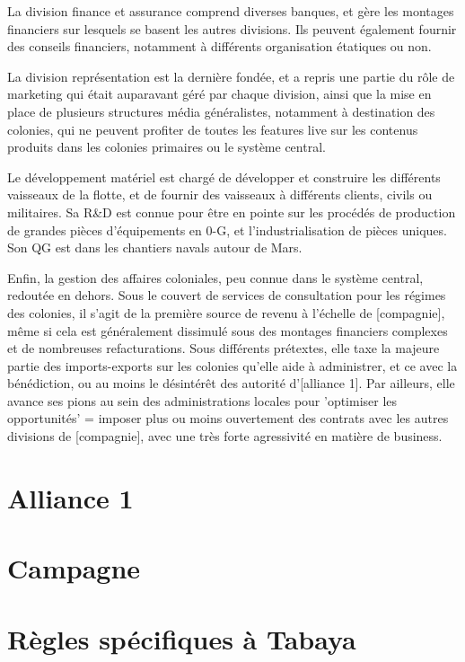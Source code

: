 \documentclass[10pt,a4paper]{book}
\begin{document}
\begin{multicols}{2}
La division finance et assurance comprend diverses banques, et gère les montages financiers sur lesquels se basent les autres divisions. Ils peuvent également fournir des conseils financiers, notamment à différents organisation étatiques ou non.

La division représentation est la dernière fondée, et a repris une partie du rôle de marketing qui était auparavant géré par chaque division, ainsi que la mise en place de plusieurs structures média généralistes, notamment à destination des colonies, qui ne peuvent profiter de toutes les features live sur les contenus produits dans les colonies primaires ou le système central.

Le développement matériel est chargé de développer et construire les différents vaisseaux de la flotte, et de fournir des vaisseaux à différents clients, civils ou militaires. Sa R\&D est connue pour être en pointe sur les procédés de production de grandes pièces d'équipements en 0-G, et l'industrialisation de pièces uniques. Son QG est dans les chantiers navals autour de Mars.

Enfin, la gestion des affaires coloniales, peu connue dans le système central, redoutée en dehors. Sous le couvert de services de consultation pour les régimes des colonies, il s'agit de la première source de revenu à l'échelle de [compagnie], même si cela est généralement dissimulé sous des montages financiers complexes et de nombreuses refacturations.  Sous différents prétextes, elle taxe la majeure partie des imports-exports sur les colonies qu'elle aide à administrer, et ce avec la bénédiction, ou au moins le désintérêt des autorité d'[alliance 1]. Par ailleurs, elle avance ses pions au sein des administrations locales pour 'optimiser les opportunités' = imposer plus ou moins ouvertement des contrats avec les autres divisions de [compagnie], avec une très forte agressivité en matière de business.
\end{multicols}
\chapter{Alliance 1}
\begin{multicols}{2}
\end{multicols}
\chapter{Campagne}
\begin{multicols}{2}
\end{multicols}
\chapter{Règles spécifiques à Tabaya}
\begin{multicols}{2}
\end{multicols}
\end{document}
